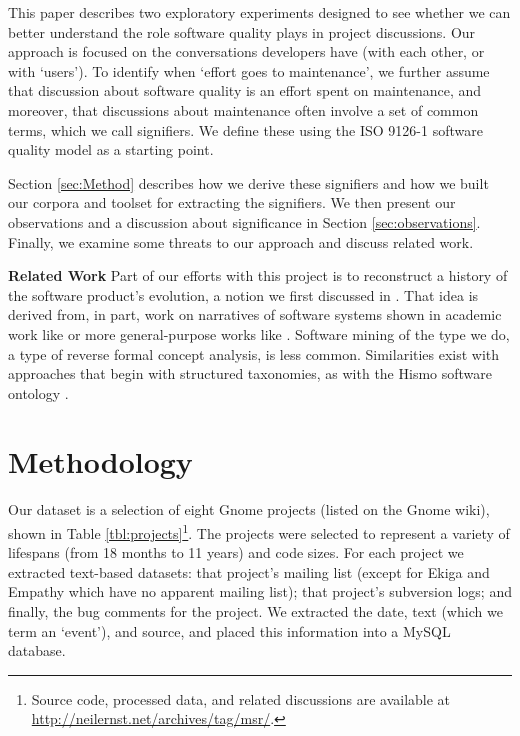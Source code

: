 \documentclass[conference, compsoc]{IEEEtran}
\begin{document}
This paper describes two exploratory experiments designed to see whether we can better understand the role software quality plays in project discussions. Our approach is focused on the conversations developers have (with each other, or with `users'). To identify when `effort goes to maintenance', we further assume that discussion about software quality is an effort spent on maintenance, and moreover, that discussions about maintenance often involve a set of common terms, which we call signifiers. We define these using the ISO 9126-1 software quality model \cite{iso9126} as a starting point. 
	
Section \ref{sec:Method} describes how we derive these signifiers and how we built our corpora and toolset for extracting the signifiers. We then present our observations and a discussion about significance in Section \ref{sec:observations}. Finally, we examine some threats to our approach and discuss related work. 

\noindent\textbf{Related Work}
Part of our efforts with this project is to reconstruct a history of the software product's evolution, a notion we first discussed in \cite{Ernst07icsm}. That idea is derived from, in part, work on narratives of software systems shown in academic work like \cite{Anton2001} or more general-purpose works like \cite{waldo93}. Software mining of the type we do, a type of reverse formal concept analysis, is less common. Similarities exist with approaches that begin with structured taxonomies, as with the Hismo software ontology \cite{Girba2006}.
	
\vspace{-2mm}
\section{Methodology}
\vspace{-2mm}
\label{sec:Method}
Our dataset is a selection of eight Gnome projects (listed on the Gnome wiki), shown in Table \ref{tbl:projects}\footnote{Source code, processed data, and related discussions are available at \url{http://neilernst.net/archives/tag/msr/}.}. The projects were selected to represent a variety of lifespans (from 18 months to 11 years) and code sizes. For each project we extracted text-based datasets: that project's mailing list (except for Ekiga and Empathy which have no apparent mailing list); that project's subversion logs; and finally, the bug comments for the project. We extracted the date, text (which we term an `event'), and source, and placed this information into a MySQL database.
\end{document}
